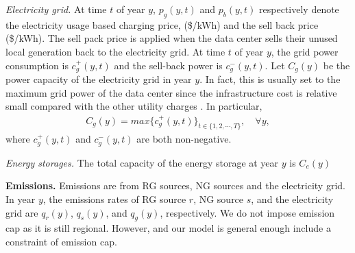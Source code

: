 \textit{Electricity grid.} At time $t$ of year $y$, $p_g(y,t)$ and $p_{b}(y,t)$ respectively denote the electricity usage based charging price, (\$/kWh) and the sell back price (\$/kWh). The sell pack price is applied when the data center sells their unused local generation back to the electricity grid. At time $t$ of year $y$, the grid power consumption is $c^+_g(y,t)$ and the sell-back power is $c^-_g(y,t)$. Let $C_{g}(y)$ be the power capacity of the electricity grid in year $y$. In fact, this is usually set to the maximum grid power of the data center since the infrastructure cost is relative small compared with the other utility charges \cite{barroso2013datacenter}. In particular,
\begin{eqnarray}
\label{const:Grid_Capacity}
C_{g}(y) = max\{c^+_g(y,t)\}_{t \in \{1, 2, \cdots, T \}} , \quad \forall y,
\end{eqnarray}
where $c^+_g(y,t)$ and $c^-_g(y,t)$ are both non-negative.
    
\textit{Energy storages.} 
The total capacity of the energy storage at year $y$ is $C_{e}(y)$



\textbf{Emissions.}  Emissions are from RG sources, NG sources and the electricity grid. In year $y$, the emissions rates of RG source $r$, NG source $s$, and the electricity grid are $q_r(y)$, $q_s(y)$, and $q_g(y)$, respectively. We do not impose emission cap as it is still regional. However, and our model is general enough include a constraint of emission cap.


